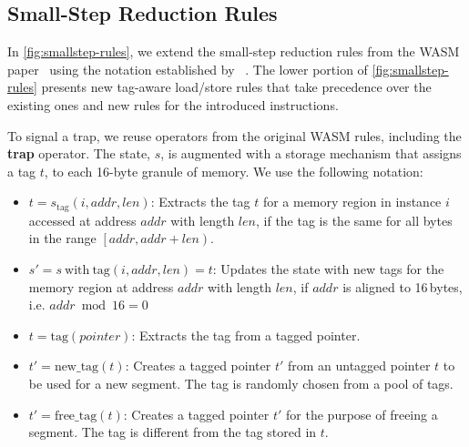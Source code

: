 \subsection{Small-Step Reduction Rules}
\label{subsec:small-step-reduction-rules}

In \cref{fig:smallstep-rules}, we extend the small-step reduction rules from the WASM paper~\cite{haas2017bringing} using the notation established by \citeauthor*{plotkin1981structural}~\cite{plotkin1981structural}.
The lower portion of \cref{fig:smallstep-rules} presents new tag-aware load/store rules that take precedence over the existing ones and new rules for the introduced instructions.

To signal a trap, we reuse operators from the original WASM rules, including the \textbf{trap} operator.
The state, $s$, is augmented with a storage mechanism that assigns a tag $t$, to each 16-byte granule of memory.
We use the following notation:

\begin{itemize}
    \item $t = s_{\text{tag}}(i, \mathit{addr}, \mathit{len})$: Extracts the tag $t$ for a memory region in instance $i$ accessed at address $\mathit{addr}$ with length $\mathit{len}$, if the tag is the same for all bytes in the range $\left[\mathit{addr}, \mathit{addr} + \mathit{len}\right)$.
    \item $s' = s\ \text{with}\ \text{tag}(i, \mathit{addr}, \mathit{len}) = t$: Updates the state with new tags for the memory region at address $\mathit{addr}$ with length $\mathit{len}$, if $\mathit{addr}$ is aligned to 16\,bytes, i.e. $\mathit{addr} \bmod 16 = 0$
    \item $t = \text{tag}(\mathit{pointer})$: Extracts the tag from a tagged pointer.
    \item $t' = \text{new\_tag}(t)$: Creates a tagged pointer $t'$ from an untagged pointer $t$ to be used for a new segment.
    The tag is randomly chosen from a pool of tags.
    \item $t' = \text{free\_tag}(t)$: Creates a tagged pointer $t'$ for the purpose of freeing a segment.
    The tag is different from the tag stored in $t$.
\end{itemize}

